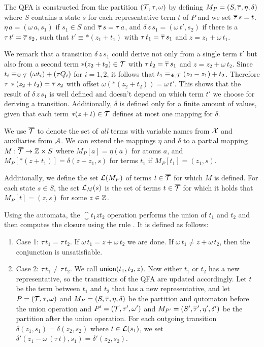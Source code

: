 The QFA is constructed from the partition  $(\mathcal{T}, \tau, \omega)$ by defining $M_P = (S, \overline{\tau}, \eta, \delta)$ where $S$ contains a state $s$ for each representative term $t$ of $P$ and we set $\overline{\tau}\,s = t$.
$\eta\,a = (\omega\,a, s_1)$ if $s_1 \in S$ and $\overline{\tau}\,s = \tau\,a$,
and $\delta\,z\,s_1 = (\omega\,t', s_2)$ if there is a $\tau\,t'=\overline{\tau}\,s_2$, such that $t' \equiv *(z_1 + t_1)$ with $\tau \,t_1= \overline{\tau}\,s_1$ and $z = z_1 + \omega\,t_1$.

We remark that a transition $\delta\,z\,s_1$ could derive not only from a single term $t'$ but also from a second term $*(z_2 + t_2) \in \mathcal{T}$ with $\tau\,t_2=\overline{\tau}\,s_1$ and $z = z_2 + \omega\,t_2$.
Since $t_i \equiv_{\Psi,\mathcal{T}} (\omega t_i) + (\tau Q_i)$ for $i = 1,2$, it follows that $t_1 \equiv_{\Psi,\mathcal{T}} (z_2 - z_1)+ t_2$.
Therefore $\tau\,*(z_2+t_2)=\overline{\tau}\,s_2$ with offset $\omega(*(z_2+t_2)) = \omega\,t'$.
This shows that the result of $\delta\,z\,s_1$ is well defined and doesn't depend on which term $t'$ we choose for deriving a transition.
Additionally, $\delta$ is defined only for a finite amount of values, given that each term $*(z + t) \in \mathcal{T}$ defines at most one mapping for $\delta$.

We use ${\overline{\mathcal{T}}}$ to denote the set of \emph{all} terms with variable names from $\mathcal{X}$ and auxiliaries from $\mathcal{A}$.
We can extend the mappings $\eta$ and $\delta$ to a partial mapping $M : {\overline{\mathcal{T}}} \rightarrow \mathbb{Z} \times S$ where $M_P[a] = \eta(a)$ for atoms $a$, and $M_P[*(z+t_1)] = \delta(z+z_1, s)$ for terms $t_1$ if $M_P[t_1] = (z_1,s)$.

Additionally, we define the set $\mathcal{L}(M_P)$ of terms $t \in {\overline{\mathcal{T}}}$ for which $M$ is defined.
For each state $s \in S$, the set $\mathcal{L}_M(s)$ is the set of terms $t \in {\overline{\mathcal{T}}}$ for which it holds that $M_P[t] = (z, s)$ for some $z \in \mathbb{Z}$.

Using the automata, the $\closure{t_1}{z}{t_2}$ operation performs the union of $t_1$ and $t_2$ and
then computes the closure using the rule .
It is defined as follows:

\begin{enumerate}
  \item Case 1: $\tau\,t_1 = \tau\,t_2$. If $\omega\,t_1 = z + \omega\,t_2$ we are done.
  If $\omega\,t_1 \neq z + \omega\,t_2$, then the conjunction is unsatisfiable.
  \item Case 2: $\tau\,t_1 \neq \tau\,t_2$. We call $\textsf{union}(t_1, t_2, z)$.
  Now either $t_1$ or $t_2$ has a new representative, so the transitions of the QFA are updated accordingly.
  Let $t$ be the term between $t_1$ and $t_2$ that has a new representative,
  and let $P = (\mathcal{T}, \tau, \omega)$ and $M_P = (S, \overline{\tau}, \eta, \delta)$ be the partition and qutomaton before the union operation
  and $P' = (\mathcal{T}, \tau', \omega')$ and $M_{P'} = (S', \overline{\tau}', \eta', \delta')$ be the partition after the union operation.
  For each outgoing transition $\delta(z_1, s_1) = \delta(z_2, s_2)$ where $t \in \mathcal{L}(s_1)$,
  we set $\delta'(z_1 - \omega\,(\tau\,t), s_1) = \delta'(z_2, s_2)$.
\end{enumerate}


